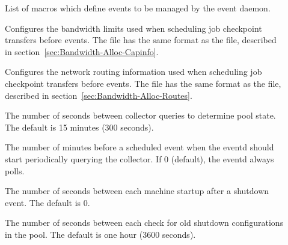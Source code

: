 \begin{description}
  
\item[] \label{param:EventList} List of macros
which define events to be managed by the event daemon.

\item[] \label{param:EventdCapInfo}
Configures the bandwidth limits used when scheduling job checkpoint
transfers before  events.
The  file has the same
format as the  file, described in
section~\ref{sec:Bandwidth-Alloc-Capinfo}.

\item[] \label{param:EventdRouteInfo}
Configures the network routing information used when scheduling job
checkpoint transfers before  events.
The  file has the same
format as the  file, described in
section~\ref{sec:Bandwidth-Alloc-Routes}.

\item[] \label{param:EventdInterval} The number
of seconds between collector queries to determine pool
state.  The default is 15 minutes (300 seconds).

\item[]
\label{param:EventdMaxPreparation}  The number of minutes before a
scheduled event when the eventd should start periodically querying the
collector.  If 0 (default), the eventd always polls.

\item[]
\label{param:EventdShutdownSlowStartInterval} The number of seconds
between each machine startup after a shutdown event.  The default is 0.

\item[]
\label{param:EventdShutdownCleanupInterval} The number of seconds
between each check for old shutdown configurations in the pool.  The default
is one hour (3600 seconds).

\end{description}
